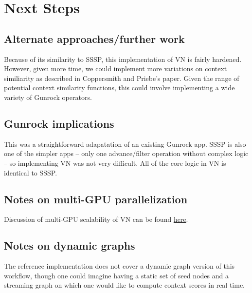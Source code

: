 \documentclass[10pt,oneside]{memoir}
\begin{document}
\hypertarget{next-steps-9}{%
\section{Next Steps}\label{next-steps-9}}

\hypertarget{alternate-approachesfurther-work}{%
\subsection{Alternate approaches/further
work}\label{alternate-approachesfurther-work}}

Because of its similarity to SSSP, this implementation of VN is fairly
hardened. However, given more time, we could implement more variations
on context similiarity as described in Coppersmith and Priebe's paper.
Given the range of potential context similarity functions, this could
involve implementing a wide variety of Gunrock operators.

\hypertarget{gunrock-implications-8}{%
\subsection{Gunrock implications}\label{gunrock-implications-8}}

This was a straightforward adapatation of an existing Gunrock app. SSSP
is also one of the simpler apps -- only one advance/filter operation
without complex logic -- so implementing VN was not very difficult. All
of the core logic in VN is identical to SSSP.

\hypertarget{notes-on-multi-gpu-parallelization-9}{%
\subsection{Notes on multi-GPU
parallelization}\label{notes-on-multi-gpu-parallelization-9}}

Discussion of multi-GPU scalability of VN can be found
\href{https://gunrock.github.io/docs/hive_year1_summary.html\#scaling-analysis-for-hive-applications}{here}.

\hypertarget{notes-on-dynamic-graphs-9}{%
\subsection{Notes on dynamic graphs}\label{notes-on-dynamic-graphs-9}}

The reference implementation does not cover a dynamic graph version of
this workflow, though one could imagine having a static set of seed
nodes and a streaming graph on which one would like to compute context
scores in real time.
\end{document}
